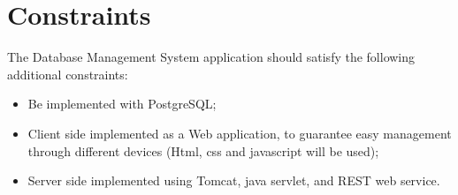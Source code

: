 \section{Constraints}

The Database Management System application should satisfy the following additional constraints:
\begin{itemize}
    \item Be implemented with PostgreSQL;
    \item Client side implemented as a Web application, to guarantee easy management through different devices (Html, css and javascript will be used);
    \item Server side implemented using Tomcat, java servlet, and REST web service.
\end{itemize}